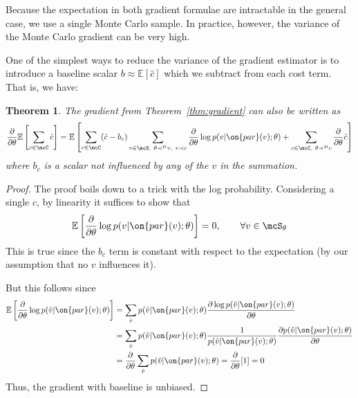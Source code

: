 \documentclass[12pt]{report}
\newtheorem{theorem}{Theorem}
\begin{document}
Because the expectation in both gradient formulae are intractable in the general case, we use a single Monte Carlo sample.
In practice, however, the variance of the Monte Carlo gradient can be very high.



One of the simplest ways to reduce the variance of the gradient estimator is to introduce a baseline scalar $b \approx \mathbb{E}[\hat{c}]$ which we subtract from each cost term. That is, we have:
\begin{theorem}
The gradient from Theorem~\ref{thm:gradient} can also be written as
\begin{equation}
\frac{\partial}{\partial \theta} \mathbb{E}\left[ \sum_{c \in \mcC} \hat{c} \right] = \mathbb{E}\left[\sum_{c \in \mcC} (\hat{c} - b_c) \sum_{v \in \mcS,~\theta \prec^D v, ~v \prec c }  \frac{\partial}{\partial\theta} \log p(v | \on{par}(v) ; \theta )  +
 \sum_{c\in \mcC,~\theta \prec^D c} \frac{\partial}{\partial \theta} \hat{c}
\right] 
\end{equation}
where $b_c$ is a scalar not influenced by any of the $v$ in the summation.
\end{theorem}

\begin{proof}
The proof boils down to a trick with the log probability. Considering a single $c$, by linearity it suffices to show that
\begin{equation*}
\mathbb{E} \left[ \frac{\partial}{\partial\theta} \log p(v | \on{par}(v) ; \theta) \right] = 0, \qquad \forall v \in \mcS_\theta
\end{equation*}
This is true since the $b_c$ term is constant with respect to the expectation (by our assumption that no $v$ influences it).

But this follows since
\begin{align*}
\mathbb{E} \left[ \frac{\partial}{\partial \theta} \log p(\hat{v} | \on{par}(v); \theta) \right] &= \sum_{\hat{v}} p(\hat{v} | \on{par}(v); \theta) \frac{\partial \log p(\hat{v} | \on{par}(v); \theta)}{\partial \theta} \\
&=  \sum_{\hat{v}} p(\hat{v} | \on{par}(v); \theta) \frac{1}{p(\hat{v} | \on{par}(v); \theta)} \frac{\partial  p(\hat{v} | \on{par}(v); \theta)}{\partial \theta}  \\
&= \frac{\partial}{\partial \theta} \sum_{\hat{v}} p(\hat{v} | \on{par}(v); \theta) =  \frac{\partial}{\partial \theta} [1] = 0
\end{align*}
Thus, the gradient with baseline is unbiased.
\end{proof}
\end{document}

